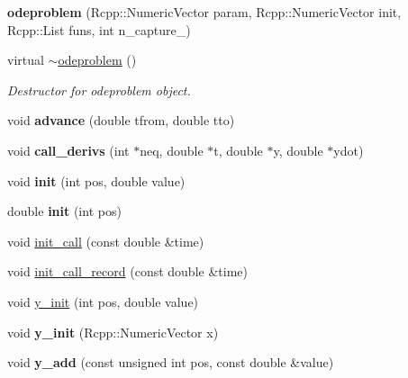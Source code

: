 \begin{DoxyCompactItemize}
\item 
\mbox{\label{classodeproblem_acc18c1c3dfc77ab1191daffdd4382f14}} 
{\bfseries odeproblem} (Rcpp\+::\+Numeric\+Vector param, Rcpp\+::\+Numeric\+Vector init, Rcpp\+::\+List funs, int n\+\_\+capture\+\_\+)
\item 
virtual \hyperlink{classodeproblem_a00c35020fc03286fd4596f25b3d82e34}{$\sim$odeproblem} ()
\begin{DoxyCompactList}\small\item\em Destructor for odeproblem object. \end{DoxyCompactList}\item 
\mbox{\label{classodeproblem_a0d35904cd64604463cba0065a3fc9c01}} 
void {\bfseries advance} (double tfrom, double tto)
\item 
\mbox{\label{classodeproblem_a3846fa84421ca3e2f84eceaf2958c519}} 
void {\bfseries call\+\_\+derivs} (int $\ast$neq, double $\ast$t, double $\ast$y, double $\ast$ydot)
\item 
\mbox{\label{classodeproblem_a2de806c10c0ce7e2a422b9d4210640f9}} 
void {\bfseries init} (int pos, double value)
\item 
\mbox{\label{classodeproblem_a1c53a46511e8c1739e4132073304c5e7}} 
double {\bfseries init} (int pos)
\item 
void \hyperlink{classodeproblem_a415e0001bfe1282764c339b6e8695ab8}{init\+\_\+call} (const double \&time)
\item 
void \hyperlink{classodeproblem_adc4a5dbcc9561903a7aa81a90e8a908b}{init\+\_\+call\+\_\+record} (const double \&time)
\item 
void \hyperlink{classodeproblem_a258d7fdca6eb1b49cac25cea9fcca9c4}{y\+\_\+init} (int pos, double value)
\item 
\mbox{\label{classodeproblem_a21fec9644d1f590e11fc80cd50ff5f5c}} 
void {\bfseries y\+\_\+init} (Rcpp\+::\+Numeric\+Vector x)
\item 
\mbox{\label{classodeproblem_aeb23afacc04444d129c91746e003240a}} 
void {\bfseries y\+\_\+add} (const unsigned int pos, const double \&value)

\end{DoxyCompactItemize}
